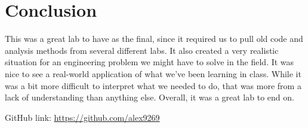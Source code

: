 \documentclass[12pt]{report}
\begin{document}
 \section{Conclusion}
 
This was a great lab to have as the final, since it required us to pull old code and analysis methods from several different labs. It also created a very realistic situation for an engineering problem we might have to solve in the field. It was nice to see a real-world application of what we've been learning in class. While it was a bit more difficult to interpret what we needed to do, that was more from a lack of understanding than anything else. Overall, it was a great lab to end on. 
 
 GitHub link: \url{https://github.com/alex9269}
 
\end{document}
